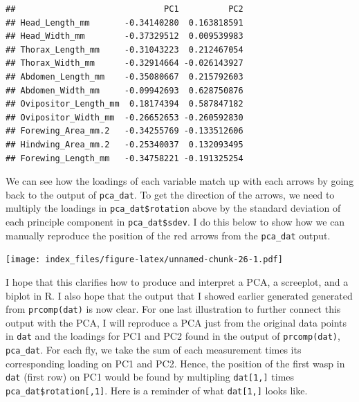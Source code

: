 \documentclass[]{article}
\newenvironment{Shaded}{\begin{snugshade}}{\end{snugshade}}
\newcommand{\CommentTok}[1]{\textcolor[rgb]{0.56,0.35,0.01}{\textit{#1}}}
\newcommand{\DataTypeTok}[1]{\textcolor[rgb]{0.13,0.29,0.53}{#1}}
\newcommand{\DecValTok}[1]{\textcolor[rgb]{0.00,0.00,0.81}{#1}}
\newcommand{\FloatTok}[1]{\textcolor[rgb]{0.00,0.00,0.81}{#1}}
\newcommand{\KeywordTok}[1]{\textcolor[rgb]{0.13,0.29,0.53}{\textbf{#1}}}
\newcommand{\NormalTok}[1]{#1}
\newcommand{\OperatorTok}[1]{\textcolor[rgb]{0.81,0.36,0.00}{\textbf{#1}}}
\newcommand{\StringTok}[1]{\textcolor[rgb]{0.31,0.60,0.02}{#1}}
\begin{document}
\begin{verbatim}
##                              PC1          PC2
## Head_Length_mm       -0.34140280  0.163818591
## Head_Width_mm        -0.37329512  0.009539983
## Thorax_Length_mm     -0.31043223  0.212467054
## Thorax_Width_mm      -0.32914664 -0.026143927
## Abdomen_Length_mm    -0.35080667  0.215792603
## Abdomen_Width_mm     -0.09942693  0.628750876
## Ovipositor_Length_mm  0.18174394  0.587847182
## Ovipositor_Width_mm  -0.26652653 -0.260592830
## Forewing_Area_mm.2   -0.34255769 -0.133512606
## Hindwing_Area_mm.2   -0.25340037  0.132093495
## Forewing_Length_mm   -0.34758221 -0.191325254
\end{verbatim}

We can see how the loadings of each variable match up with each arrows
by going back to the output of \texttt{pca\_dat}. To get the direction
of the arrows, we need to multiply the loadings in
\texttt{pca\_dat\$rotation} above by the standard deviation of each
principle component in \texttt{pca\_dat\$sdev}. I do this below to show
how we can manually reproduce the position of the red arrows from the
\texttt{pca\_dat} output.

\begin{Shaded}
\end{Shaded}

\texttt{[image: index\_files/figure-latex/unnamed-chunk-26-1.pdf]}

I hope that this clarifies how to produce and interpret a PCA, a
screeplot, and a biplot in R. I also hope that the output that I showed
earlier generated generated from \texttt{prcomp(dat)} is now clear. For
one last illustration to further connect this output with the PCA, I
will reproduce a PCA just from the original data points in \texttt{dat}
and the loadings for PC1 and PC2 found in the output of
\texttt{prcomp(dat)}, \texttt{pca\_dat}. For each fly, we take the sum
of each measurement times its corresponding loading on PC1 and PC2.
Hence, the position of the first wasp in \texttt{dat} (first row) on PC1
would be found by multipling \texttt{dat{[}1,{]}} times
\texttt{pca\_dat\$rotation{[},1{]}}. Here is a reminder of what
\texttt{dat{[}1,{]}} looks like.
\end{document}
